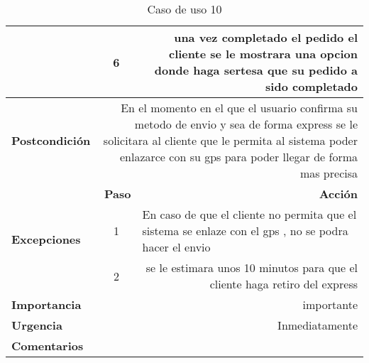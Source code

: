 \documentclass[conference]{IEEEtran}
\begin{document}
\begin{table}[H]
\begin{adjustbox}{width=0.47\textwidth}
\begin{tabular}{|p{11.215em}|r|r|}
\cmidrule{2-3}    \multicolumn{1}{|c|}{} & \multicolumn{1}{c|}{6} & \multicolumn{1}{p{32em}|}{una vez completado el pedido el cliente se le mostrara una opcion donde haga sertesa que su pedido a sido completado } \\
    \midrule
    \textbf{Postcondición} & \multicolumn{2}{p{37.355em}|}{En el momento en el que el usuario confirma su metodo de envio y sea de forma express se le solicitara al cliente que le permita al sistema poder enlazarce con su gps para poder llegar de forma mas precisa} \\
    \midrule
    \multirow{4}[6]{*}{\textbf{Excepciones}} & \multicolumn{1}{p{5.355em}|}{\textbf{Paso}} & \multicolumn{1}{p{32em}|}{\textbf{Acción}} \\
\cmidrule{2-3}    \multicolumn{1}{|c|}{} & \multicolumn{1}{c|}{\multirow{2}[2]{*}{1}} & \multicolumn{1}{l|}{\multirow{2}[2]{*}{En caso de que el cliente no permita que el sistema se enlaze con el gps , no se podra hacer el envio }} \\
    \multicolumn{1}{|c|}{} &       &  \\
\cmidrule{2-3}    \multicolumn{1}{|c|}{} & \multicolumn{1}{c|}{2} & \multicolumn{1}{p{32em}|}{se le estimara unos 10 minutos para que el cliente haga retiro del express } \\
    \midrule
    \textbf{Importancia} & \multicolumn{2}{p{37.355em}|}{importante } \\
    \midrule
    \textbf{Urgencia} & \multicolumn{2}{p{37.355em}|}{Inmediatamente} \\
    \midrule
    \textbf{Comentarios} & \multicolumn{2}{r|}{} \\
    \bottomrule
    \end{tabular}%
    \end{adjustbox}
    \vspace{0.3cm}
    \caption{Caso de uso 10}
  \label{tab:addlabel}%
\end{table}%
\end{document}
